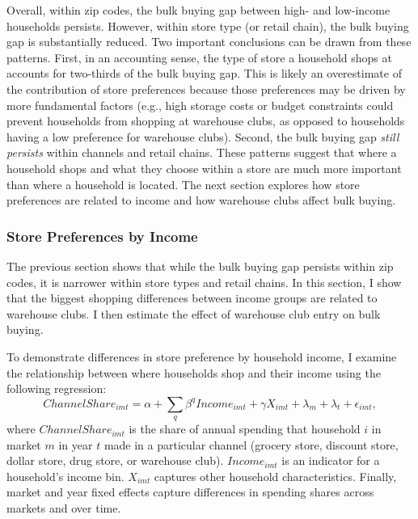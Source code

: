 \documentclass[AER]{AEA_mal}
\begin{document}
Overall, within zip codes, the bulk buying gap between high- and low-income households persists. However, within store type (or retail chain), the bulk buying gap is substantially reduced. Two important conclusions can be drawn from these patterns. First, in an accounting sense, the type of store a household shops at accounts for two-thirds of the bulk buying gap. This is likely an overestimate of the contribution of store preferences because those preferences may be driven by more fundamental factors (e.g., high storage costs or budget constraints could prevent households from shopping at warehouse clubs, as opposed to households having a low preference for warehouse clubs). Second, the bulk buying gap \textit{still persists} within channels and retail chains. These patterns suggest that where a household shops and what they choose within a store are much more important than where a household is located. The next section explores how store preferences are related to income and how warehouse clubs affect bulk buying.

\subsubsection{Store Preferences by Income}
\label{sec:storePrefs}

The previous section shows that while the bulk buying gap persists within zip codes, it is narrower within store types and retail chains. In this section, I show that the biggest shopping differences between income groups are related to warehouse clubs. I then estimate the effect of warehouse club entry on bulk buying.

To demonstrate differences in store preference by household income, I examine the relationship between where households shop and their income using the following regression:
\begin{equation}
\label{eq:storePreference}
ChannelShare_{imt} = \alpha + \sum_q \beta^q Income_{imt} + \gamma X_{imt} + \lambda_{m} + \lambda_t + \epsilon_{imt},
\end{equation}
where $ChannelShare_{imt}$ is the share of annual spending that household $i$ in market $m$ in year $t$ made in a particular channel (grocery store, discount store, dollar store, drug store, or warehouse club). $Income_{imt}$ is an indicator for a household's income bin. $X_{imt}$ captures other household characteristics. Finally, market and year fixed effects capture differences in spending shares across markets and over time.
\end{document}
